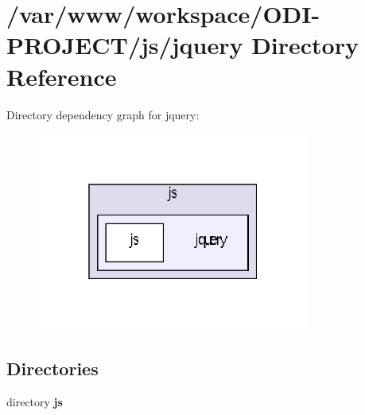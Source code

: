 \section{/var/www/workspace/\+O\+D\+I-\/\+P\+R\+O\+J\+E\+C\+T/js/jquery Directory Reference}
\label{dir_2a4475503749973e92be9cbf3d2b2d9d}
Directory dependency graph for jquery\+:\nopagebreak
\begin{figure}[H]
\begin{center}
\leavevmode
\includegraphics[width=254pt]{dir_2a4475503749973e92be9cbf3d2b2d9d_dep}
\end{center}
\end{figure}
\subsection*{Directories}
\begin{DoxyCompactItemize}
\item 
directory {\bf js}
\end{DoxyCompactItemize}
